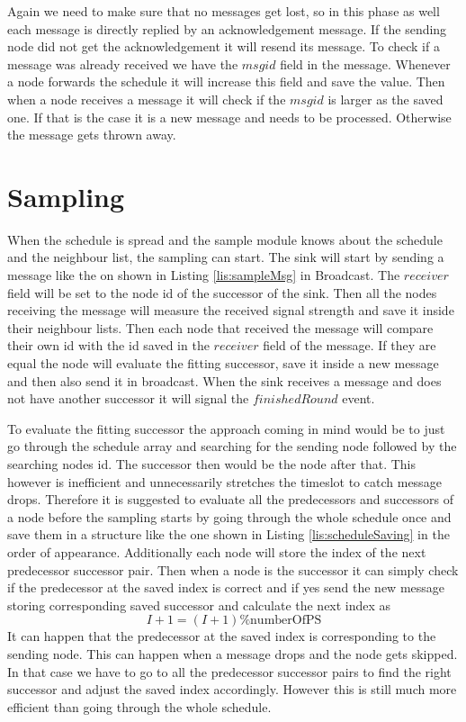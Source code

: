 Again we need to make sure that no messages get lost, so in this phase as well each message is directly replied by an acknowledgement message. If the sending node did not get the acknowledgement it will resend its message. To check if a message was already received we have the $msgid$ field in the message. Whenever a node forwards the schedule it will increase this field and save the value. Then when a node receives a message it will check if the $msgid$ is larger as the saved one. If that is the case it is a new message and needs to be processed. Otherwise the message gets thrown away. 
\section{Sampling}
When the schedule is spread and the sample module knows about the schedule and the neighbour list, the sampling can start. The sink will start by sending a  message like the on shown in Listing \ref{lis:sampleMsg} in Broadcast. The $receiver$ field will be set to the node id of the successor of the sink. Then all the nodes receiving the message will measure the received signal strength and save it inside their neighbour lists. Then each node that received the message will compare their own id with the id saved in the $receiver$ field of the message. If they are equal the node will evaluate the fitting successor, save it inside a new message and then also send it in broadcast. When the sink receives a message and does not have another successor it will signal the $finishedRound$ event.

To evaluate the fitting successor the approach coming in mind would be to just go through the schedule array and searching for the sending node followed by the searching nodes id. The successor then would be the node after that. This however is inefficient and unnecessarily stretches the timeslot to catch message drops. Therefore it is suggested to evaluate all the predecessors and successors of a node before the sampling starts by going through the whole schedule once and save them in a structure like the one shown in Listing \ref{lis:scheduleSaving} in the order of appearance. Additionally each node will store the index of the next predecessor successor pair. Then when a node is the successor it can simply check if the predecessor at the saved index is correct and if yes send the new message storing corresponding saved successor and calculate the next index as
\[ I+1 = (I + 1)\%\mbox{numberOfPS}\]      
It can happen that the predecessor at the saved index is corresponding to the sending node. This can happen when a message drops and the node gets skipped.
In that case we have to go to all the predecessor successor pairs to find the right successor and adjust the saved index accordingly. However this is still much more efficient than going through the whole schedule.

